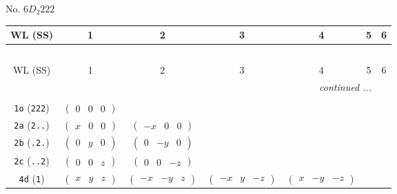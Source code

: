 \documentclass[fleqn,9pt,landscape]{jsarticle}
\begin{document}
\newpage
No. 6\quad$D_{2}$\quad$222$\quad[ orthorhombic ]
\begin{center}
\renewcommand{\arraystretch}{1.2}
\begin{longtable}{ccccccc}
 \hline \hline
WL (SS) & 1 & 2 & 3 & 4 & 5 & 6 \\ \hline \endfirsthead

\multicolumn{6}{l}{\tablename\ \thetable{}} \\
 \hline \hline
WL (SS) & 1 & 2 & 3 & 4 & 5 & 6 \\ \hline \endhead

 \hline \hline
\multicolumn{6}{r}{\footnotesize\it continued ...} \\ \endfoot

 \hline \hline
\multicolumn{6}{r}{} \\ \endlastfoot

{\tt 1o} ({\tt 222}) & $ \begin{pmatrix} 0 & 0 & 0 \end{pmatrix} $ & $  $ & $  $ & $  $ \\ \hline
{\tt 2a} ({\tt 2..}) & $ \begin{pmatrix} x & 0 & 0 \end{pmatrix} $ & $ \begin{pmatrix} - x & 0 & 0 \end{pmatrix} $ & $  $ & $  $ \\ \hline
{\tt 2b} ({\tt .2.}) & $ \begin{pmatrix} 0 & y & 0 \end{pmatrix} $ & $ \begin{pmatrix} 0 & - y & 0 \end{pmatrix} $ & $  $ & $  $ \\ \hline
{\tt 2c} ({\tt ..2}) & $ \begin{pmatrix} 0 & 0 & z \end{pmatrix} $ & $ \begin{pmatrix} 0 & 0 & - z \end{pmatrix} $ & $  $ & $  $ \\ \hline
{\tt 4d} ({\tt 1}) & $ \begin{pmatrix} x & y & z \end{pmatrix} $ & $ \begin{pmatrix} - x & - y & z \end{pmatrix} $ & $ \begin{pmatrix} - x & y & - z \end{pmatrix} $ & $ \begin{pmatrix} x & - y & - z \end{pmatrix} $ \\
\end{longtable}
\end{center}
\end{document}
